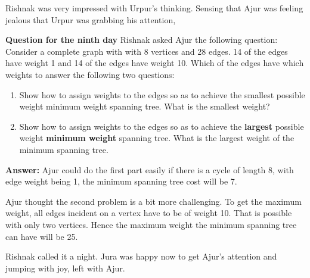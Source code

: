 Rishnak was very impressed with Urpur's thinking. Sensing that Ajur was feeling jealous that Urpur was grabbing his attention,

\textbf{Question for the ninth day}
Rishnak asked Ajur the following question: Consider a complete graph with with 8 vertices and 28 edges. 14 of the edges have weight
1 and 14 of the edges have weight 10. Which of the edges have which weights to answer the
following  two questions: 
\begin{enumerate}
    \item Show how to assign weights to the edges so as to achieve the smallest possible weight minimum weight spanning tree. What is the smallest weight?
\item Show how to assign weights to the edges so as to achieve the \textbf{largest} possible weight \textbf{minimum weight} spanning tree. What is the largest weight of the minimum spanning tree.
 
\end{enumerate}

\textbf{Answer:} Ajur could do the first part easily if there is a cycle of length 8, with edge weight being 1, the minimum spanning tree cost will be 7.

Ajur thought the second problem is a bit more challenging. To get the maximum weight, all edges incident on a vertex have to be of weight 10. That is possible with only two vertices. Hence the maximum weight the minimum spanning tree can have will be 25.


 Rishnak called it a night. Jura was happy now to get Ajur's attention and jumping with joy, left with Ajur.